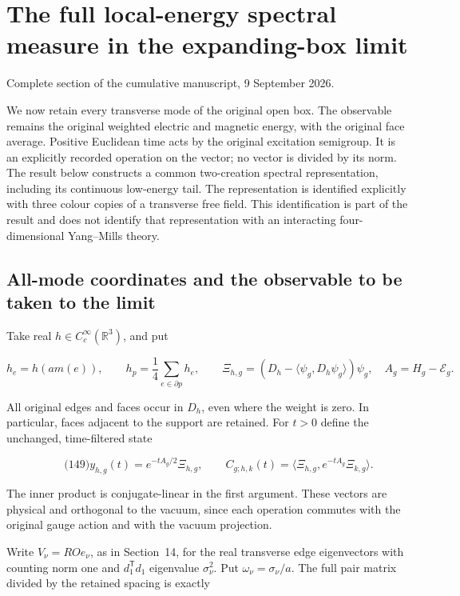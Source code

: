 \section{The full local-energy spectral measure in the expanding-box
limit}\label{full-local-spectrum-md-the-full-local-energy-spectral-measure-in-the-expanding-box-limit}

Complete section of the cumulative manuscript, 9 September 2026.

We now retain every transverse mode of the original open box. The
observable remains the original weighted electric and magnetic energy,
with the original face average. Positive Euclidean time acts by the
original excitation semigroup. It is an explicitly recorded operation on
the vector; no vector is divided by its norm. The result below
constructs a common two-creation spectral representation, including its
continuous low-energy tail. The representation is identified explicitly
with three colour copies of a transverse free field. This identification
is part of the result and does not identify that representation with an
interacting four-dimensional Yang--Mills theory.

\subsection{All-mode coordinates and the observable to be taken to the
limit}\label{full-local-spectrum-md-all-mode-coordinates-and-the-observable-to-be-taken-to-the-limit}

Take real \(h\in C_c^\infty(\mathbb R^3)\), and put

\[
h_e=h(a m(e)),\qquad h_p=\frac14\sum_{e\in\partial p}h_e,\qquad
 \Xi_{h,g}=(D_h-\langle\psi_g,D_h\psi_g\rangle)\psi_g,
 \quad A_g=H_g-\mathcal E_g .
\]

All original edges and faces occur in \(D_h\), even where the weight is
zero. In particular, faces adjacent to the support are retained. For
\(t>0\) define the unchanged, time-filtered state

\[
\qquad\text{(149)}
 y_{h,g}(t)=e^{-tA_g/2}\Xi_{h,g},\qquad
 C_{g;h,k}(t)=\langle\Xi_{h,g},e^{-tA_g}\Xi_{k,g}\rangle.
\]

The inner product is conjugate-linear in the first argument. These
vectors are physical and orthogonal to the vacuum, since each operation
commutes with the original gauge action and with the vacuum projection.

Write \(V_\nu=RO e_\nu\), as in Section~14, for the real transverse edge
eigenvectors with counting norm one and \(d_1^{\mathsf T}d_1\)
eigenvalue \(\sigma_\nu^2\). Put \(\omega_\nu=\sigma_\nu/a\). The full
pair matrix divided by the retained spacing is exactly

